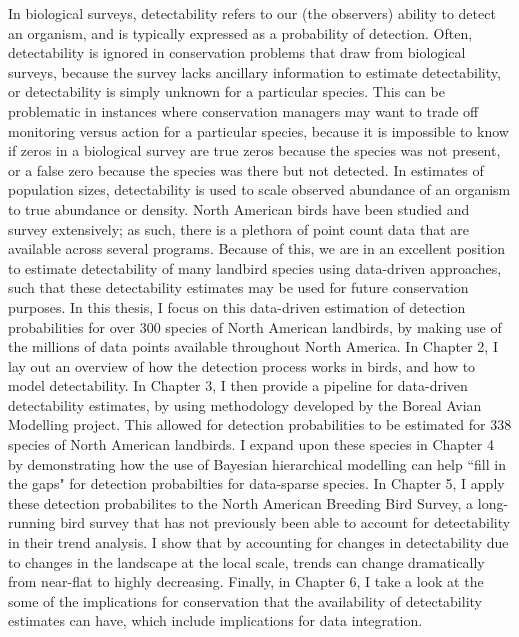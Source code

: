 \par In biological surveys, detectability refers to our (the observers) ability to detect an organism, and is typically expressed as a probability of detection. 
Often, detectability is ignored in conservation problems that draw from biological surveys, because the survey lacks ancillary information to estimate detectability, or detectability is simply unknown for a particular species.
This can be problematic in instances where conservation managers may want to trade off monitoring versus action for a particular species, because it is impossible to know if zeros in a biological survey are true zeros because the species was not present, or a false zero because the species was there but not detected.
In estimates of population sizes, detectability is used to scale observed abundance of an organism to true abundance or density.
North American birds have been studied and survey extensively; as such, there is a plethora of point count data that are available across several programs.
Because of this, we are in an excellent position to estimate detectability of many landbird species using data-driven approaches, such that these detectability estimates may be used for future conservation purposes.
In this thesis, I focus on this data-driven estimation of detection probabilities for over 300 species of North American landbirds, by making use of the millions of data points available throughout North America.
In Chapter 2, I lay out an overview of how the detection process works in birds, and how to model detectability.
In Chapter 3, I then provide a pipeline for data-driven detectability estimates, by using methodology developed by the Boreal Avian Modelling project.
This allowed for detection probabilities to be estimated for 338 species of North American landbirds.
I expand upon these species in Chapter 4 by demonstrating how the use of Bayesian hierarchical modelling can help ``fill in the gaps" for detection probabilties for data-sparse species.
In Chapter 5, I apply these detection probabilites to the North American Breeding Bird Survey, a long-running bird survey that has not previously been able to account for detectability in their trend analysis.
I show that by accounting for changes in detectability due to changes in the landscape at the local scale, trends can change dramatically from near-flat to highly decreasing.
Finally, in Chapter 6, I take a look at the some of the implications for conservation that the availability of detectability estimates can have, which include implications for data integration.

